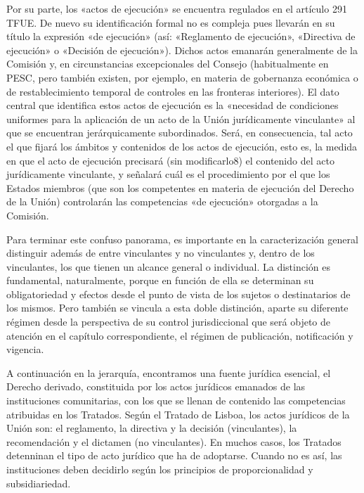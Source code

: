 \documentclass[10pt,a4paper]{article}
\begin{document}
Por su parte, los «actos de ejecución» se encuentra regulados en el artículo 291 TFUE. De nuevo su identificación formal no es compleja pues llevarán en su título la expresión «de ejecución» (así: «Reglamento de ejecución», «Directiva de ejecución» o «Decisión de ejecución»). Dichos actos emanarán generalmente de la Comisión y, en circunstancias excepcionales del Consejo (habitualmente en PESC, pero también existen, por ejemplo, en materia de gobernanza económica o de restablecimiento temporal de controles en las fronteras interiores). El dato central que identifica estos actos de ejecución es la «necesidad de condiciones uniformes para la aplicación de un acto de la Unión jurídicamente vinculante» al que se encuentran jerárquicamente subordinados. Será, en consecuencia, tal acto el que fijará los ámbitos y contenidos de los actos de ejecución, esto es, la medida en que el acto de ejecución precisará (sin modificarlo8) el contenido del acto jurídicamente vinculante, y señalará cuál es el procedimiento por el que los Estados miembros (que son los competentes en materia de ejecución del Derecho de la Unión) controlarán las competencias «de ejecución» otorgadas a la Comisión.

Para terminar este confuso panorama, es importante en la caracterización general distinguir además de entre vinculantes y no vinculantes y, dentro de los vinculantes, los que tienen un alcance general o individual. La distinción es fundamental, naturalmente, porque en función de ella se determinan su obligatoriedad y efectos desde el punto de vista de los sujetos o destinatarios de los mismos. Pero también se vincula a esta doble distinción, aparte su diferente régimen desde la perspectiva de su control jurisdiccional que será objeto de atención en el capítulo correspondiente, el régimen de publicación, notificación y vigencia.


A continuación en la jerarquía, encontramos una fuente jurídica esencial, el Derecho derivado, constituida por los actos jurídicos emanados de las instituciones comunitarias, con los que se llenan de contenido las competencias atribuidas en los Tratados. Según el Tratado de Lisboa, los actos jurídicos de la Unión son: el reglamento, la directiva y la decisión (vinculantes), la recomendación y el dictamen (no vinculantes). En muchos casos, los Tratados detenninan el tipo de acto jurídico que ha de adoptarse. Cuando no es así, las instituciones deben decidirlo según los principios de proporcionalidad y subsidiariedad.
\end{document}
